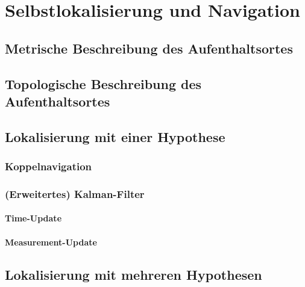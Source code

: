 \documentclass[a4paper, 11pt, accentcolor = tud3b]{tudreport}
\begin{document}
		\section{Selbstlokalisierung und Navigation} %

			\subsection{Metrische Beschreibung des Aufenthaltsortes} %

			\subsection{Topologische Beschreibung des Aufenthaltsortes} %

			\subsection{Lokalisierung mit einer Hypothese} %

				\subsubsection{Koppelnavigation} %

				\subsubsection{(Erweitertes) Kalman-Filter} %

					\paragraph{Time-Update} %

					\paragraph{Measurement-Update} %

			\subsection{Lokalisierung mit mehreren Hypothesen} %
\end{document}
